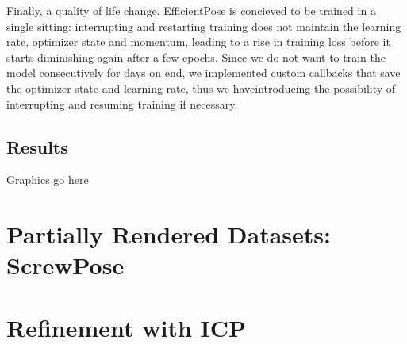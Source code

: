 Finally, a quality of life change. EfficientPose is concieved to be trained in a single sitting: interrupting and restarting training does not maintain the learning rate, optimizer state and momentum, leading to a rise in training loss before it starts diminishing again after a few epochs. Since we do not want to train the model consecutively for days on end, we implemented custom callbacks that save the optimizer state and learning rate, thus we haveintroducing the possibility of interrupting and resuming training if necessary.

\subsection{Results}
Graphics go here

\section{Partially Rendered Datasets: ScrewPose}

\section{Refinement with ICP}
